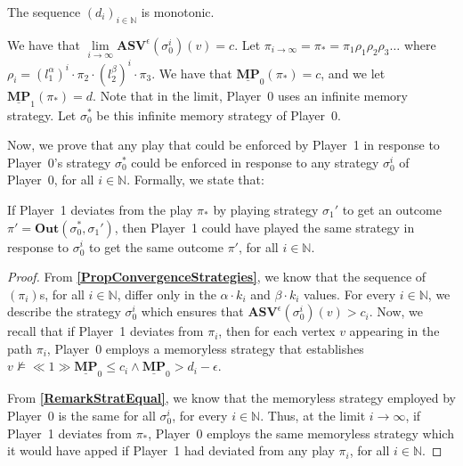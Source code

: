 \begin{proposition}
    \label{PropMonotonicDi}
    The sequence $(d_i)_{i \in \mathbb{N}}$ is monotonic. 
\end{proposition}

We have that $\lim \limits_{i \to \infty} \mathbf{ASV}^{\epsilon}(\sigma_0^i)(v) = c$. Let $\pi_{i \to \infty} = \pi_* = \pi_1 \rho_1 \rho_2 \rho_3 \dotsc$ where $\rho_i = (l^{\alpha}_{1})^i \cdot \pi_{2} \cdot (l^{\beta}_{2})^i \cdot \pi_{3}$. We have that $\underline{\mathbf{MP}}_0(\pi_*) = c$, and we let $\underline{\mathbf{MP}}_1(\pi_*) = d$. Note that in the limit, Player~0 uses an infinite memory strategy. Let $\sigma_0^*$ be this infinite memory strategy of Player~0.

Now, we prove that any play that could be enforced by Player~1 in response to Player~0's strategy $\sigma_0^*$ could be enforced in response to any strategy $\sigma_0^i$ of Player~0, for all $i \in \mathbb{N}$. Formally, we state that:

\begin{proposition}
    \label{PropContradictionPlayEnforcable}
    If Player~1 deviates from the play $\pi_*$ by playing strategy $\sigma_1'$ to get an outcome $\pi' = \mathbf{Out}(\sigma_0^*, \sigma_1')$, then Player~1 could have played the same strategy in response to $\sigma_0^i$ to get the same outcome $\pi'$, for all $i \in \mathbb{N}$. 
\end{proposition}
\begin{proof}
    From \textbf{\cref{PropConvergenceStrategies}}, we know that the sequence of $(\pi_i)$s, for all $i \in \mathbb{N}$, differ only in the $\alpha \cdot k_i$ and $\beta \cdot k_i$ values.
    For every $i \in \mathbb{N}$, we describe the strategy $\sigma_0^i$ which ensures that $\mathbf{ASV}^{\epsilon}(\sigma_0^i)(v) > c_i$. Now, we recall that if Player~1 deviates from $\pi_i$, then for each vertex $v$ appearing in the path $\pi_i$, Player~0 employs a memoryless strategy that establishes $v \nvDash \ll 1 \gg \underline{\mathbf{MP}}_0 \leqslant c_i \land \underline{\mathbf{MP}}_0 > d_i - \epsilon$.

    From \textbf{\cref{RemarkStratEqual}}, we know that the memoryless strategy employed by Player~0 is the same for all $\sigma_0^i$, for every $i \in \mathbb{N}$. Thus, at the limit $i \to \infty$, if Player~1 deviates from $\pi_*$, Player~0 employs the same memoryless strategy which it would have apped if Player~1 had deviated from any play $\pi_i$, for all $i \in \mathbb{N}$.
\end{proof}

